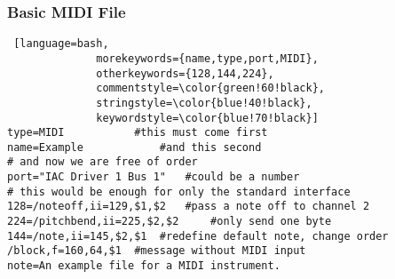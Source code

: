 \documentclass[12pt]{article}
\begin{document}
\subsubsection{Basic MIDI File}
\begin{lstlisting} [language=bash,
			  morekeywords={name,type,port,MIDI},
			  otherkeywords={128,144,224},
			  commentstyle=\color{green!60!black},
			  stringstyle=\color{blue!40!black},
			  keywordstyle=\color{blue!70!black}]
type=MIDI 			#this must come first
name=Example			#and this second
# and now we are free of order
port="IAC Driver 1 Bus 1" 	#could be a number
# this would be enough for only the standard interface
128=/noteoff,ii=129,$1,$2 	#pass a note off to channel 2
224=/pitchbend,ii=225,$2,$2 	#only send one byte
144=/note,ii=145,$2,$1	#redefine default note, change order
/block,f=160,64,$1	#message without MIDI input
note=An example file for a MIDI instrument.
\end{lstlisting}

\vspace{3cm}
\end{document}
